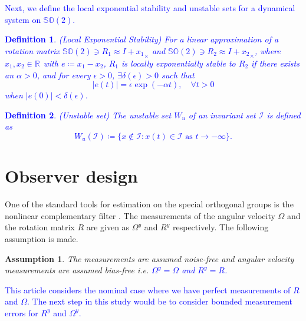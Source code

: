 \documentclass{article}
\newcommand{\SOtwo}{\mathbb{SO}(2)}
\newcommand{\R}[1]{\mathbb{R}^{#1}}
\newcommand{\Omegay}{\Omega^y}
\newtheorem{assumption}{Assumption}
\newtheorem{definition}{Definition}
\newcommand{\textblue}[1]{\textcolor{blue}{#1}}
\begin{document}
\textblue{Next, we define the local exponential stability and unstable sets for a dynamical system on $\SOtwo$.
\begin{definition}{(Local Exponential Stability)}
For a linear approximation of a rotation matrix $\SOtwo\ni R_1 \approx I + {x_1}_\times$ and $\SOtwo\ni R_2 \approx I + {x_2}_\times$, where $x_1, x_2\in \R{}$ with $e \coloneqq x_1 - x_2$, $R_1$ is locally exponentially stable to $R_2$ if there exists an $\alpha > 0$, and for every $\epsilon >0$, $\exists \delta (\epsilon) > 0$ such that \[|e(t)| = \epsilon \exp(-\alpha t), \quad \forall t > 0\] when $|e(0)| < \delta(\epsilon)$.
\end{definition}}
\textblue{\begin{definition}(Unstable set)
The unstable set $W_u$ of an invariant set $\mathcal{I}$ is defined as 
\[W_u(\mathcal{I}) \coloneqq\{ x\notin \mathcal{I} : x(t) \in \mathcal{I} \text{ as } t \to -\infty\}.\]
\end{definition}
}
\section{Observer design}

One of the standard tools for estimation on the special orthogonal groups is the nonlinear complementary filter \cite{mahony_complementaryFilter}. The measurements of the angular velocity $\Omega$ and the rotation matrix $R$ are given as $\Omegay$ and $R^y$ respectively. The following assumption is made. 
\begin{assumption} \label{ass:no_meas_noise}
    The measurements are assumed noise-free and angular velocity measurements are assumed bias-free i.e. \textblue{$\Omegay=\Omega$ and $R^y = R$.}
\end{assumption}
\textblue{This article considers the nominal case where we have perfect measurements of $R$ and $\Omega$. The next step in this study would be to consider bounded measurement errors for $R^y$ and $\Omega^y$.}
\end{document}
